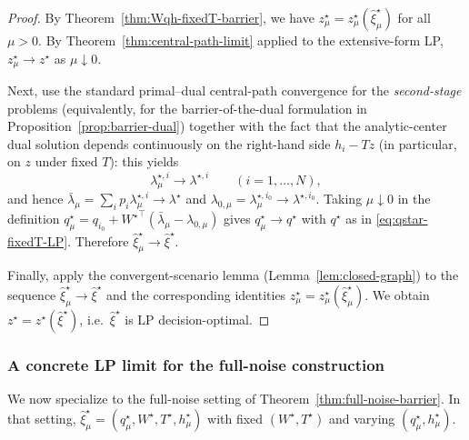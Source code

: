 \documentclass[11pt]{article}
\theoremstyle{plain}
\theoremstyle{definition}
\theoremstyle{remark}
\begin{document}
\begin{proof}
By Theorem~\ref{thm:Wqh-fixedT-barrier}, we have $z_\mu^\star=z_\mu^\star(\hat\xi_\mu^\star)$ for all $\mu>0$.
By Theorem~\ref{thm:central-path-limit} applied to the extensive-form LP, $z_\mu^\star\to z^\star$ as $\mu\downarrow 0$.

Next, use the standard primal--dual central-path convergence for the \emph{second-stage} problems (equivalently, for the
barrier-of-the-dual formulation in Proposition~\ref{prop:barrier-dual}) together with the fact that the analytic-center dual
solution depends continuously on the right-hand side $h_i-Tz$ (in particular, on $z$ under fixed $T$): this yields
\[
\lambda_{\mu}^{\star,i}\longrightarrow \lambda^{\star,i}\qquad (i=1,\dots,N),
\]
and hence $\bar\lambda_\mu=\sum_i p_i\lambda_{\mu}^{\star,i}\to\lambda^\star$ and
$\lambda_{0,\mu}=\lambda_{\mu}^{\star,i_0}\to\lambda^{\star,i_0}$.
Taking $\mu\downarrow 0$ in the definition $q_\mu^\star=q_{i_0}+{W^\star}^\top(\bar\lambda_\mu-\lambda_{0,\mu})$
gives $q_\mu^\star\to q^\star$ with $q^\star$ as in \eqref{eq:qstar-fixedT-LP}.
Therefore $\hat\xi_\mu^\star\to\hat\xi^\star$.

Finally, apply the convergent-scenario lemma (Lemma~\ref{lem:closed-graph}) to the sequence
$\hat\xi_\mu^\star\to\hat\xi^\star$ and the corresponding identities $z_\mu^\star=z_\mu^\star(\hat\xi_\mu^\star)$.
We obtain $z^\star=z^\star(\hat\xi^\star)$, i.e.\ $\hat\xi^\star$ is LP decision-optimal.
\end{proof}

\subsubsection{A concrete LP limit for the full-noise construction}\label{subsec:full-noise-limit-LP}

We now specialize to the full-noise setting of Theorem~\ref{thm:full-noise-barrier}.
In that setting, $\hat\xi_\mu^\star=(q_\mu^\star,W^\star,T^\star,h_\mu^\star)$ with fixed $(W^\star,T^\star)$ and varying $(q_\mu^\star,h_\mu^\star)$.
\end{document}
